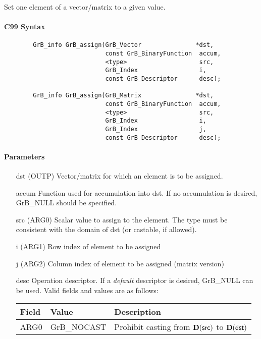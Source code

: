 Set one element of a vector/matrix to a given value.

\paragraph{C99 Syntax}

\begin{verbatim}
        GrB_info GrB_assign(GrB_Vector               *dst,
                            const GrB_BinaryFunction  accum,
                            <type>                    src,
                            GrB_Index                 i,
                            const GrB_Descriptor      desc); 

        GrB_info GrB_assign(GrB_Matrix               *dst,
                            const GrB_BinaryFunction  accum,
                            <type>                    src,
                            GrB_Index                 i,
                            GrB_Index                 j,
                            const GrB_Descriptor      desc); 
\end{verbatim}

\paragraph{Parameters}

\begin{itemize}[leftmargin=1.1in]
    \item[{\sf dst}]   ({\sf OUTP}) Vector/matrix for which an element is to be assigned.

    \item[{\sf accum}] Function used for accumulation into {\sf dst}.  If no accumulation
                        is desired, {\sf GrB\_NULL} should be specified.

    \item[{\sf src}]   ({\sf ARG0}) Scalar value to assign to the element.  The type must
                              be consistent with the domain of dst (or castable, if allowed).
    \item[{\sf i}]     ({\sf ARG1}) Row index of element to be assigned
    \item[{\sf j}]     ({\sf ARG2}) Column index of element to be assigned (matrix version)

    \item[{\sf desc}]   Operation descriptor. If a
    \emph{default} descriptor is desired, {\sf GrB\_NULL} can be
    used. Valid fields and values are as follows: \\
    \begin{tabular}{lll}
    Field  & Value & Description \\
    \hline
    {\sf ARG0} & {\sf GrB\_NOCAST} & Prohibit casting from $\bold{D}({\sf src})$ to $\bold{D}({\sf dst})$ \\
    \end{tabular}

\end{itemize}

